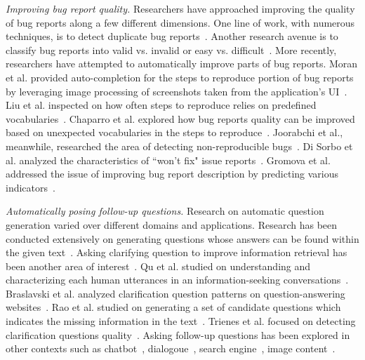 \noindent
{\em Improving bug report quality.} Researchers have approached improving the quality of bug reports along a few different dimensions. One line of work, with numerous techniques, is to detect duplicate bug reports~\cite{chaparro19reformulating}. Another research avenue is to classify bug reports into valid vs. invalid or easy vs. difficult~\cite{fan20chaff,hooimeijer07modeling}. More recently, researchers have attempted to automatically improve parts of bug reports. Moran et al. provided auto-completion for the steps to reproduce portion of bug reports by leveraging image processing of screenshots taken from the application's UI~\cite{moran15autocompleting}. Liu et al. inspected on how often steps to reproduce relies on predefined vocabularies~\cite{liu2020automated}. Chaparro et al. explored how bug reports quality can be improved based on unexpected vocabularies in the steps to reproduce~\cite{Chaparro2019AssessingTQ}. Joorabchi et al., meanwhile, researched the area of detecting non-reproducible bugs~\cite{erfani2014works}. Di Sorbo et al. analyzed the characteristics of ``won't fix" issue reports~\cite{Sorbo2019WontWF}. Gromova et al. addressed the issue of improving bug report description by predicting various indicators~\cite{gromova2019raising}.

\noindent
{\em Automatically posing follow-up questions.} Research on automatic question generation varied over different domains and applications. Research has been conducted extensively on generating questions whose answers can be found within the given text~\cite{vanderwende2008importance, rus2011question, zhou2017neural, heilman2010good, duan2017question,  du2017learning}. Asking clarifying question to improve information retrieval has been another area of interest~\cite{10.1145/3366423.3380126, 10.1145/3331184.3331265, stoyanchev2014towards}.  Qu et al. studied on understanding and characterizing each human utterances in an information-seeking conversations~\cite{10.1145/3209978.3210124}. Braslavski et al. analyzed clarification question patterns on question-answering websites~\cite{10.1145/3020165.3022149}. Rao et al. studied on generating a set of candidate questions which indicates the missing information in the text~\cite{rao-daume-iii-2018-learning}. Trienes et al. focused on detecting clarification questions quality~\cite{trienes2019identifying}. Asking follow-up questions has been explored in other contexts such as chatbot~\cite{Hancock2019LearningFD}, dialogoue~\cite{de2005implementing}, search engine~\cite{Ren2020ConversationsWS}, image content~\cite{Mostafazadeh_2016}.
